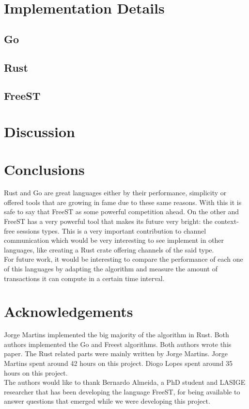 \documentclass[runningheads]{llncs}
\begin{document}
\section{Implementation Details}
\subsection{Go}
\lipsum[1]
\subsection{Rust}
\lipsum[1]
\subsection{FreeST}
\lipsum[1]
\section{Discussion}
\section{Conclusions}
Rust and Go are great languages either by their performance, simplicity or offered tools that are growing in fame due to these same reasons. With this it is safe to say that FreeST as some powerful competition ahead. On the other and FreeST has a very powerful tool that makes its future very bright: the context-free sessions types.
This is a very important contribution to channel communication which would be very interesting to see implement in other languages, like creating a Rust crate offering channels of the said type.
\\For future work, it would be interesting to compare the performance of each one of this languages by adapting the algorithm and measure the amount of transactions it can compute in a certain time interval.
\section*{Acknowledgements}
Jorge Martins implemented the big majority of the algorithm in Rust. Both authors implemented the Go and Freest algorithms.
Both authors wrote this paper. The Rust related parts were mainly written by Jorge Martins.
Jorge Martins spent around 42 hours on this project. Diogo Lopes spent around 35 hours on this project.\\
The authors would like to thank Bernardo Almeida, a PhD student and LASIGE researcher that has been developing the language FreeST, for being available to answer questions that emerged while we were developing this project.


\end{document}
